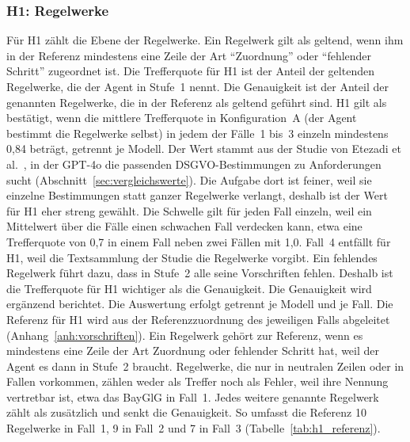 \subsubsection{H1: Regelwerke}
Für H1 zählt die Ebene der Regelwerke.
Ein Regelwerk gilt als geltend, wenn ihm in der Referenz mindestens eine Zeile der Art \enquote{Zuordnung} oder \enquote{fehlender Schritt} zugeordnet ist.
Die Trefferquote für H1 ist der Anteil der geltenden Regelwerke, die der Agent in Stufe~1 nennt.
Die Genauigkeit ist der Anteil der genannten Regelwerke, die in der Referenz als geltend geführt sind.
H1 gilt als bestätigt, wenn die mittlere Trefferquote in Konfiguration~A (der Agent bestimmt die Regelwerke selbst) in jedem der Fälle~1 bis~3 einzeln mindestens 0,84 beträgt, getrennt je Modell.
Der Wert stammt aus der Studie von Etezadi et al.~\cite{etezadi2025}, in der GPT-4o die passenden DSGVO-Bestimmungen zu Anforderungen sucht (Abschnitt~\ref{sec:vergleichswerte}).
Die Aufgabe dort ist feiner, weil sie einzelne Bestimmungen statt ganzer Regelwerke verlangt, deshalb ist der Wert für H1 eher streng gewählt.
Die Schwelle gilt für jeden Fall einzeln, weil ein Mittelwert über die Fälle einen schwachen Fall verdecken kann, etwa eine Trefferquote von 0,7 in einem Fall neben zwei Fällen mit 1,0.
Fall~4 entfällt für H1, weil die Textsammlung der Studie die Regelwerke vorgibt.
Ein fehlendes Regelwerk führt dazu, dass in Stufe~2 alle seine Vorschriften fehlen.
Deshalb ist die Trefferquote für H1 wichtiger als die Genauigkeit.
Die Genauigkeit wird ergänzend berichtet.
Die Auswertung erfolgt getrennt je Modell und je Fall.
Die Referenz für H1 wird aus der Referenzzuordnung des jeweiligen Falls abgeleitet (Anhang~\ref{anh:vorschriften}).
Ein Regelwerk gehört zur Referenz, wenn es mindestens eine Zeile der Art Zuordnung oder fehlender Schritt hat, weil der Agent es dann in Stufe~2 braucht.
Regelwerke, die nur in neutralen Zeilen oder in Fallen vorkommen, zählen weder als Treffer noch als Fehler, weil ihre Nennung vertretbar ist, etwa das BayGlG in Fall~1.
Jedes weitere genannte Regelwerk zählt als zusätzlich und senkt die Genauigkeit.
So umfasst die Referenz 10 Regelwerke in Fall~1, 9 in Fall~2 und 7 in Fall~3 (Tabelle~\ref{tab:h1_referenz}).
